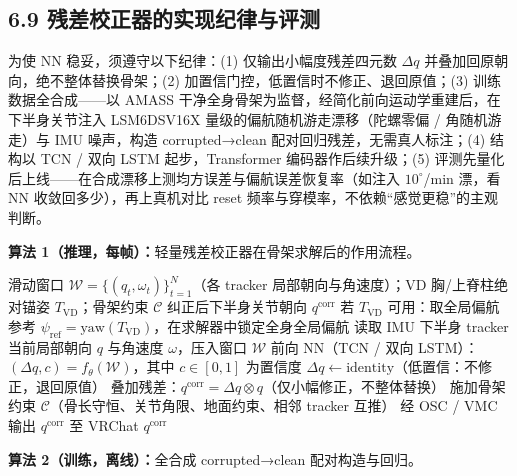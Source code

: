 \documentclass[UTF8,11pt,a4paper]{ctexart}
\begin{document}
\subsection{6.9 残差校正器的实现纪律与评测}
为使 NN 稳妥，须遵守以下纪律：(1) 仅输出小幅度残差四元数 $\Delta q$ 并叠加回原朝向，绝不整体替换骨架；(2) 加置信门控，低置信时不修正、退回原值；(3) 训练数据全合成——以 AMASS 干净全身骨架为监督，经简化前向运动学重建后，在下半身关节注入 LSM6DSV16X 量级的偏航随机游走漂移（陀螺零偏 / 角随机游走）与 IMU 噪声，构造 corrupted→clean 配对回归残差，无需真人标注；(4) 结构以 TCN / 双向 LSTM 起步，Transformer 编码器作后续升级；(5) 评测先量化后上线——在合成漂移上测均方误差与偏航误差恢复率（如注入 $10^{\circ}$/min 漂，看 NN 收敛回多少），再上真机对比 reset 频率与穿模率，不依赖“感觉更稳”的主观判断。

\noindent\textbf{算法 1（推理，每帧）：}轻量残差校正器在骨架求解后的作用流程。

\begin{algorithm}[H]
\caption{NN 残差校正器推理流程（每帧）}
\label{alg:infer}
\begin{algorithmic}[1]
\REQUIRE 滑动窗口 $\mathcal{W}=\{(q_t,\omega_t)\}_{t=1}^{N}$（各 tracker 局部朝向与角速度）；VD 胸/上脊柱绝对锚姿 $T_{\text{VD}}$；骨架约束 $\mathcal{C}$
\ENSURE 纠正后下半身关节朝向 $q^{\text{corr}}$
\STATE 若 $T_{\text{VD}}$ 可用：取全局偏航参考 $\psi_{\text{ref}} = \text{yaw}(T_{\text{VD}})$，在求解器中锁定全身全局偏航
\STATE 读取 IMU 下半身 tracker 当前局部朝向 $q$ 与角速度 $\omega$，压入窗口 $\mathcal{W}$
\STATE 前向 NN（TCN / 双向 LSTM）：$(\Delta q, c) = f_{\theta}(\mathcal{W})$，其中 $c\in[0,1]$ 为置信度
    \STATE $\Delta q \leftarrow \text{identity}$（低置信：不修正，退回原值）
\ENDIF
\STATE 叠加残差：$q^{\text{corr}} = \Delta q \otimes q$（仅小幅修正，不整体替换）
\STATE 施加骨架约束 $\mathcal{C}$（骨长守恒、关节角限、地面约束、相邻 tracker 互推）
\STATE 经 OSC / VMC 输出 $q^{\text{corr}}$ 至 VRChat
\RETURN $q^{\text{corr}}$
\end{algorithmic}
\end{algorithm}

\noindent\textbf{算法 2（训练，离线）：}全合成 corrupted→clean 配对构造与回归。
\end{document}
